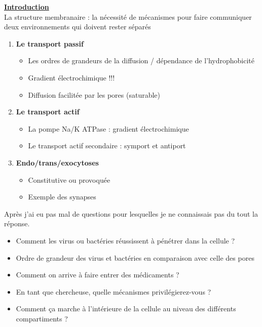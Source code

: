 \textbf{\uline{Introduction}}\\
La structure membranaire : la nécessité de mécanismes pour faire communiquer deux environnements qui doivent rester séparés\\

\begin{enumerate}[label=\color{red}{\bf \Roman*.}]
    \item {\bf \color{red} Le transport passif}
    \begin{itemize}
        \item Les ordres de grandeurs de la diffusion / dépendance de l’hydrophobicité
        \item Gradient électrochimique !!!
        \item Diffusion facilitée par les pores (saturable)
    \end{itemize}
    \item {\bf \color{red} Le transport actif}
    \begin{itemize}
        \item La pompe Na/K ATPase : gradient électrochimique
        \item Le transport actif secondaire : symport et antiport
    \end{itemize}
    \item {\bf \color{red} Endo/trans/exocytoses}
    \begin{itemize}
        \item Constitutive ou provoquée
        \item Exemple des synapses
    \end{itemize}
\end{enumerate}

\vspace{.5cm}

Après j’ai eu pas mal de questions pour lesquelles je ne connaissais pas du tout la réponse.
\begin{itemize}
    \item Comment les virus ou bactéries réussissent à pénétrer dans la cellule ?
    \item Ordre de grandeur des virus et bactéries en comparaison avec celle des pores
    \item Comment on arrive à faire entrer des médicaments ?
    \item En tant que chercheuse, quelle mécanismes privilégierez-vous ?
    \item Comment ça marche à l’intérieure de la cellule au niveau des différents compartiments ?
\end{itemize}

